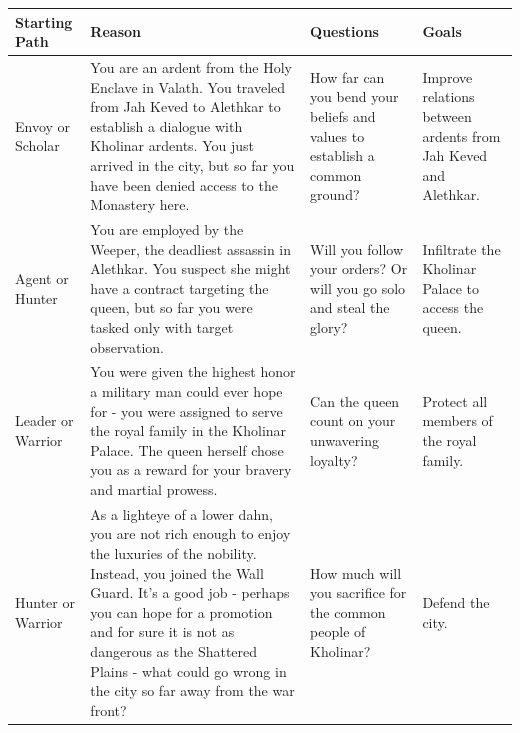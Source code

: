 
\onecolumn

\begin{table}
	\centering
	\label{backstoryIdeas}
	
	\begin{tabular}{p{2.8cm} p{6cm} p{3cm} p{3cm}}
		\hline
		\color{black} Starting Path & \color{black} Reason & \color{black} Questions & \color{black} Goals \newline \\ \hline
		
		\color{black} Envoy or Scholar & 
		\color{black} You are an ardent from the Holy Enclave in Valath. You traveled from Jah Keved to Alethkar to establish a dialogue with Kholinar ardents. You just arrived in the city, but so far you have been denied access to the Monastery here. & 
		\color{black} How far can you bend your beliefs and values to establish a common ground? & 
		\color{black} Improve relations between ardents from Jah Keved and Alethkar. 
		\\ 
		\hline
				
		\color{black} Agent or Hunter & 
		\color{black} You are employed by the Weeper, the deadliest assassin in Alethkar. You suspect she might have a contract targeting the queen, but so far you were tasked only with target observation.  & 
		\color{black} Will you follow your orders? Or will you go solo and steal the glory? & 
		\color{black} Infiltrate the Kholinar Palace to access the queen. 
		\\ 
		\hline
		
		\color{black} Leader or Warrior & 
		\color{black} You were given the highest honor a military man could ever hope for - you were assigned to serve the royal family in the Kholinar Palace. The queen herself chose you as a reward for your bravery and martial prowess. & 
		\color{black} Can the queen count on your unwavering loyalty? & 
		\color{black} Protect all members of the royal family.
		\\ 
		\hline
		
		\color{black} Hunter or Warrior & 
		\color{black} As a lighteye of a lower dahn, you are not rich enough to enjoy the luxuries of the nobility. Instead, you joined the Wall Guard. It’s a good job - perhaps you can hope for a promotion and for sure it is not as dangerous as the Shattered Plains - what could go wrong in the city so far away from the war front? & 
		\color{black} How much will you sacrifice for the common people of Kholinar? & 
		\color{black} Defend the city. 
		\\ 
		\hline
		

\end{tabular}
\end{table}
